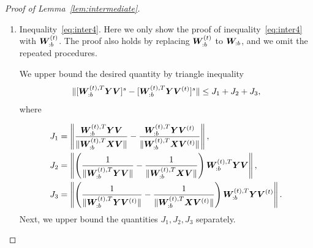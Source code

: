 \documentclass[journal]{IEEEtran}
\theoremstyle{definition}
\theoremstyle{definition}
\newcommand{\of}[1]{\left(#1\right)}
\begin{document}
\begin{proof}[Proof of Lemma~\ref{lem:intermediate}]
\begin{enumerate}[wide]
     
    Hence, combining inequalities~\eqref{eq:i11} and~\eqref{eq:i12} yields  
    \begin{equation}\label{eq:i1}
        I_1 \lesssim \frac{r L^{(t)}}{\Delta_{\min}} + \sqrt{\frac{ r^{2K} + p r^{K+1}}{p^K}} \frac{\sqrt{L^{(t)}}}{\Delta_{\min}}.
    \end{equation}
    
        For $I_2$ and $I_3$, recall that $\onorm{\mW_{:b}^T \mX \mV} = \onorm{\mS_{b:}} \geq c_3$ and $\onormSize{}{  \mW_{:b}^{(t),T} \mX \mV } \geq C_1$ by inequality~\eqref{eq:i11_sin_dom}. By triangle inequality and \eqref{eq:cond1} in Condition~\ref{cond:origin}, we have 
    \begin{equation}\label{eq:i2}
         I_2 \leq \frac{ \onormSize{}{ \mW_{:b}^T \mE \mV } }{ \onormSize{}{\mW_{:b}^T \mX \mV}  } \lesssim  \onormSize{}{ \mW_{:b}^T \mE \mV }  \lesssim \frac{r^K}{p^{K/2}},
    \end{equation}
    and 
    \begin{equation}\label{eq:i3}
        I_3 \leq \frac{ \onormSize{}{ \mW_{:b}^{(t),T} \mE \mV } }{ \onormSize{}{\mW_{:b}^{(t),T} \mX \mV}  }  \lesssim \onormSize{}{ \mW_{:b}^{(t),T} \mE \mV } \lesssim \frac{r^K}{p^{K/2}}.
     \end{equation}
       Therefore, combining the inequalities~\eqref{eq:i1}, \eqref{eq:i2}, and \eqref{eq:i3}, we finish the proof of inequality~\eqref{eq:inter3}.
    
    \item Inequality~\eqref{eq:inter4}. Here we only show the proof of inequality~\eqref{eq:inter4} with $\bm{W}_{:b}^{(t)}$. The proof also holds by replacing $\bm{W}_{:b}^{(t)}$ to $\bm{W}_{:b}$, and we omit the repeated procedures.
    
    We upper bound the desired quantity by triangle inequality
    \begin{equation}
         \lVert  [   \bm{W}_{:b}^{(t), T}  \bm Y \bm{V}]^s -  [  \bm{W}_{:b}^{(t), T}  \bm Y \bm{V}^{(t)}]^s \rVert  \leq J_1 + J_2 + J_3,
    \end{equation}
    where 
    
    \vspace{-0.5cm}
    \small
    \begin{align}
        J_1 &= \onorm{ \frac{\mW_{:b}^{(t),T} \mY \mV }{\onormSize{}{ \mW_{:b}^{(t),T} \mX \mV }} - \frac{\mW_{:b}^{(t),T} \mY \mV^{(t)} }{\onormSize{}{ \mW_{:b}^{(t),T} \mX \mV^{(t)} }}  },\\
        J_2 & = \onorm{\of{ \frac{1}{\onormSize{}{\mW_{:b}^{(t),T} \mY \mV}} -  \frac{1}{\onormSize{}{\mW_{:b}^{(t),T} \mX \mV}}  } \mW_{:b}^{(t),T} \mY \mV },\\
        J_3 &= \onorm{\of{ \frac{1}{\onormSize{}{\mW_{:b}^{(t),T} \mY \mV^{(t)}}} -  \frac{1}{\onormSize{}{\mW_{:b}^{(t),T} \mX \mV^{(t)}} }  } \mW_{:b}^{(t), T} \mY \mV^{(t)} }.
    \end{align}
    \normalsize
    Next, we upper bound the quantities $J_1, J_2, J_3$ separately. 


\end{enumerate}
\end{proof}
\end{document}

